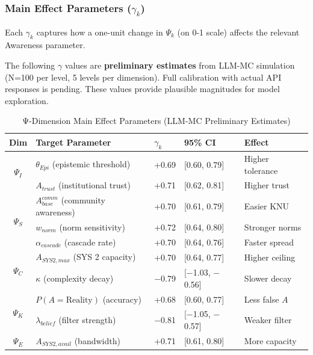 \subsubsection{Main Effect Parameters ($\gamma_k$)}

Each $\gamma_k$ captures how a one-unit change in $\Psi_k$ (on 0-1 scale) affects the relevant Awareness parameter.

\begin{note}
The following $\gamma$ values are \textbf{preliminary estimates} from LLM-MC simulation (N=100 per level, 5 levels per dimension). Full calibration with actual API responses is pending. These values provide plausible magnitudes for model exploration.
\end{note}

\begin{table}[htbp]
\centering
\caption{Ψ-Dimension Main Effect Parameters (LLM-MC Preliminary Estimates)}
\label{tab:psi-gamma-main}
\renewcommand{\arraystretch}{1.4}
\small
\begin{tabular}{@{}cllll@{}}
\toprule
\textbf{Dim} & \textbf{Target Parameter} & \textbf{$\gamma_k$} & \textbf{95\% CI} & \textbf{Effect} \\
\midrule
\multirow{2}{*}{$\Psi_I$} 
& $\theta_{Epi}$ (epistemic threshold) & +0.69 & [0.60, 0.79] & Higher tolerance \\
& $A_{trust}$ (institutional trust) & +0.71 & [0.62, 0.81] & Higher trust \\
\midrule
\multirow{3}{*}{$\Psi_S$} 
& $A^{comm}_{base}$ (community awareness) & +0.70 & [0.61, 0.79] & Easier KNU \\
& $w_{norm}$ (norm sensitivity) & +0.72 & [0.64, 0.80] & Stronger norms \\
& $\alpha_{cascade}$ (cascade rate) & +0.70 & [0.64, 0.76] & Faster spread \\
\midrule
\multirow{2}{*}{$\Psi_C$} 
& $A_{SYS2,max}$ (SYS 2 capacity) & +0.70 & [0.64, 0.77] & Higher ceiling \\
& $\kappa$ (complexity decay) & $-$0.79 & [$-$1.03, $-$0.56] & Slower decay \\
\midrule
\multirow{2}{*}{$\Psi_K$} 
& $P(A=\text{Reality})$ (accuracy) & +0.68 & [0.60, 0.77] & Less false $A$ \\
& $\lambda_{belief}$ (filter strength) & $-$0.81 & [$-$1.05, $-$0.57] & Weaker filter \\
\midrule
\multirow{2}{*}{$\Psi_E$} 
& $A_{SYS2,avail}$ (bandwidth) & +0.71 & [0.61, 0.80] & More capacity \\

\end{tabular}
\end{table}
